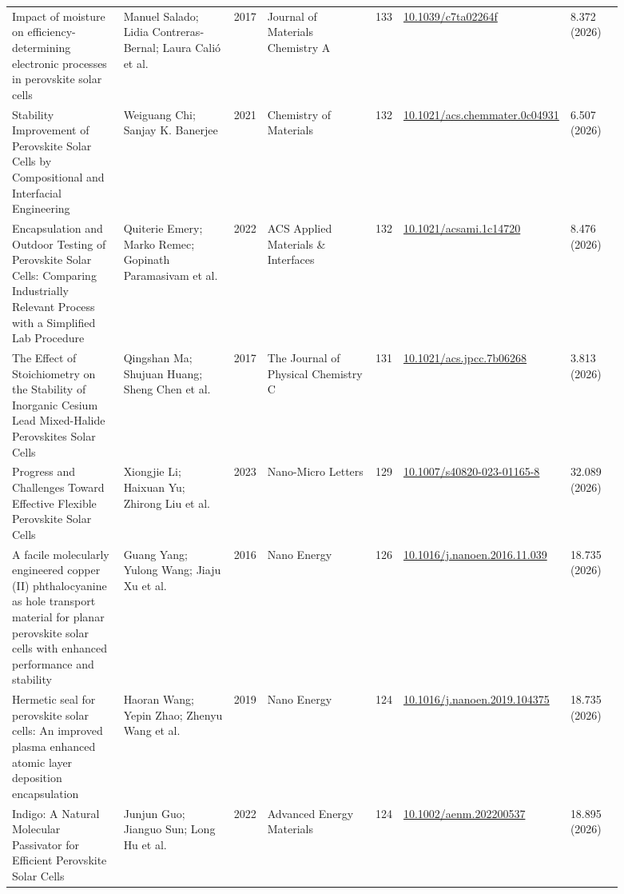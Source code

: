 \documentclass[10pt,a4paper]{article}
\begin{document}
{\begin{longtable}{p{0.197\linewidth}p{0.197\linewidth}p{0.043\linewidth}p{0.197\linewidth}p{0.043\linewidth}p{0.117\linewidth}p{0.098\linewidth}}
Impact of moisture on efficiency-determining electronic processes in perovskite solar cells & Manuel Salado; Lidia Contreras‐Bernal; Laura Calió et al. & 2017 & Journal of Materials Chemistry A & 133 & \href{https://doi.org/10.1039/c7ta02264f}{10.1039/c7ta02264f} & 8.372 (2026) \\
Stability Improvement of Perovskite Solar Cells by Compositional and Interfacial Engineering & Weiguang Chi; Sanjay K. Banerjee & 2021 & Chemistry of Materials & 132 & \href{https://doi.org/10.1021/acs.chemmater.0c04931}{10.1021/acs.chemmater.0c04931} & 6.507 (2026) \\
Encapsulation and Outdoor Testing of Perovskite Solar Cells: Comparing Industrially Relevant Process with a Simplified Lab Procedure & Quiterie Emery; Marko Remec; Gopinath Paramasivam et al. & 2022 & ACS Applied Materials \& Interfaces & 132 & \href{https://doi.org/10.1021/acsami.1c14720}{10.1021/acsami.1c14720} & 8.476 (2026) \\
The Effect of Stoichiometry on the Stability of Inorganic Cesium Lead Mixed-Halide Perovskites Solar Cells & Qingshan Ma; Shujuan Huang; Sheng Chen et al. & 2017 & The Journal of Physical Chemistry C & 131 & \href{https://doi.org/10.1021/acs.jpcc.7b06268}{10.1021/acs.jpcc.7b06268} & 3.813 (2026) \\
Progress and Challenges Toward Effective Flexible Perovskite Solar Cells & Xiongjie Li; Haixuan Yu; Zhirong Liu et al. & 2023 & Nano-Micro Letters & 129 & \href{https://doi.org/10.1007/s40820-023-01165-8}{10.1007/s40820-023-01165-8} & 32.089 (2026) \\
A facile molecularly engineered copper (II) phthalocyanine as hole transport material for planar perovskite solar cells with enhanced performance and stability & Guang Yang; Yulong Wang; Jiaju Xu et al. & 2016 & Nano Energy & 126 & \href{https://doi.org/10.1016/j.nanoen.2016.11.039}{10.1016/j.nanoen.2016.11.039} & 18.735 (2026) \\
Hermetic seal for perovskite solar cells: An improved plasma enhanced atomic layer deposition encapsulation & Haoran Wang; Yepin Zhao; Zhenyu Wang et al. & 2019 & Nano Energy & 124 & \href{https://doi.org/10.1016/j.nanoen.2019.104375}{10.1016/j.nanoen.2019.104375} & 18.735 (2026) \\
Indigo: A Natural Molecular Passivator for Efficient Perovskite Solar Cells & Junjun Guo; Jianguo Sun; Long Hu et al. & 2022 & Advanced Energy Materials & 124 & \href{https://doi.org/10.1002/aenm.202200537}{10.1002/aenm.202200537} & 18.895 (2026) \\

\end{longtable}}
\end{document}
